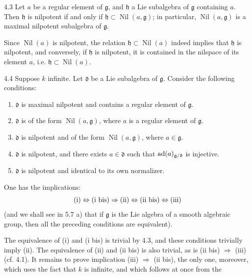 \begin{corollary}{4.3}\label{XIII.4.3}
Let $a$ be a regular element of $\mathfrak g$, and $\mathfrak h$ a Lie
subalgebra of $\mathfrak g$ containing $a$. Then $\mathfrak h$ is
nilpotent if and only if $\mathfrak h\subset\operatorname{Nil}(a,\mathfrak g)$;
in particular, $\operatorname{Nil}(a,\mathfrak g)$ is a maximal
nilpotent subalgebra of $\mathfrak g$.
\end{corollary}
Since $\operatorname{Nil}(a)$ is nilpotent, the relation
$\mathfrak h\subset\operatorname{Nil}(a)$ indeed implies that
$\mathfrak h$ is nilpotent, and conversely, if $\mathfrak h$ is
nilpotent, it is contained in the nilspace of its element $a$, i.e.
$\mathfrak h\subset\operatorname{Nil}(a)$.

\begin{proposition}{4.4}\label{XIII.4.4}
Suppose $k$ infinite. Let $\mathfrak d$ be a Lie subalgebra of
$\mathfrak g$. Consider the following conditions:
\begin{enumerate}[label=\textup{(\roman*)}]
\item $\mathfrak d$ is maximal nilpotent and contains a regular element
of $\mathfrak g$.
\item[\textup{(i bis)}] $\mathfrak d$ is of the form
$\operatorname{Nil}(a,\mathfrak g)$, where $a$ is a regular element of
$\mathfrak g$.
\item $\mathfrak d$ is nilpotent and of the form
$\operatorname{Nil}(a,\mathfrak g)$, where $a\in\mathfrak g$.
\item[\textup{(ii bis)}] $\mathfrak d$ is nilpotent, and there exists
$a\in\mathfrak d$ such that $\operatorname{ad}(a)_{\mathfrak g/\mathfrak d}$ is injective.
\item $\mathfrak d$ is nilpotent and identical to its own normalizer.
\end{enumerate}
One has the implications:
\[
 \textup{(i)}\Leftrightarrow\textup{(i bis)}\Rightarrow\textup{(ii)}
 \Leftrightarrow\textup{(ii bis)}\Leftrightarrow\textup{(iii)}
\]
(and we shall see in 5.7 a) that if $\mathfrak g$ is the Lie algebra
of a smooth algebraic group, then all the preceding conditions are
equivalent).
\end{proposition}
The equivalence of (i) and (i bis) is trivial by 4.3, and these
conditions trivially imply (ii). The equivalence of (ii) and (ii bis)
is also trivial, as is (ii bis) $\Rightarrow$ (iii) (cf. 4.1). It remains
to prove implication (iii) $\Rightarrow$ (ii bis), the only one,
moreover, which uses the fact that $k$ is infinite, and which follows
at once from the

